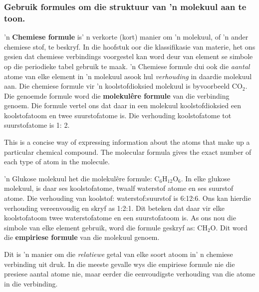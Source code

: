 \subsubsection*{Gebruik formules om die struktuur van 'n molekuul aan te toon.}
'n \textbf{Chemiese formule} is' n verkorte (kort) manier om 'n molekuul, of 'n ander chemiese stof, te beskryf. In die hoofstuk oor die klassifikasie van materie, het ons gesien dat chemiese verbindings voorgestel kan word deur van element se simbole op die periodieke tabel gebruik te maak. 'n Chemiese formule dui ook die \textsl{aantal} atome van elke element in 'n molekuul asook hul \textsl{verhouding} in daardie molekuul aan. Die chemiese formule vir 'n koolstofdioksied molekuul is byvoorbeeld ${\text{CO}}_{2}$. Die genoemde formule word die \textbf{molekul\^{e}re formule} van die verbinding genoem. Die formule vertel ons dat daar in een molekuul koolstofdioksied een koolstofatoom en twee suurstofatome is. Die verhouding koolstofatome tot suurstofatome is 1: 2.
\vspace{\rubberspace}\par
        \label{m38120*fhsst!!!underscore!!!id87}
  {This is a concise way of expressing information about the atoms that make up a particular chemical compound. The molecular formula gives the exact number of each type of atom in the molecule. } 

'n Glukose molekuul het die molekulêre formule: ${\text{C}}_{6}{\text{H}}_{12}{\text{O}}_{6}$. In elke glukose molekuul, is daar ses koolstofatome, twaalf waterstof atome en ses suurstof atome. Die verhouding van koolstof: waterstof:suurstof is 6:12:6. Ons kan hierdie verhouding vereenvoudig en skryf as 1:2:1. Dit beteken dat daar vir elke koolstofatoom twee waterstofatome en een suurstofatoom is. As ons nou die simbole van elke element  gebruik, word die formule geskryf as: ${\text{CH}}_{2}\text{O}$. Dit word die \textbf{empiriese formule} van die molekuul genoem.
\vspace{\rubberspace}\par
        \label{m38120*fhsst!!!underscore!!!id93}
 { Dit is 'n manier om die \textsl{relatiewe} getal van elke soort atoom in' n chemiese verbinding uit druk. In die meeste gevalle wys die empiriese formule nie die presiese aantal atome nie, maar eerder die eenvoudigste verhouding van die atome in die verbinding.} 

